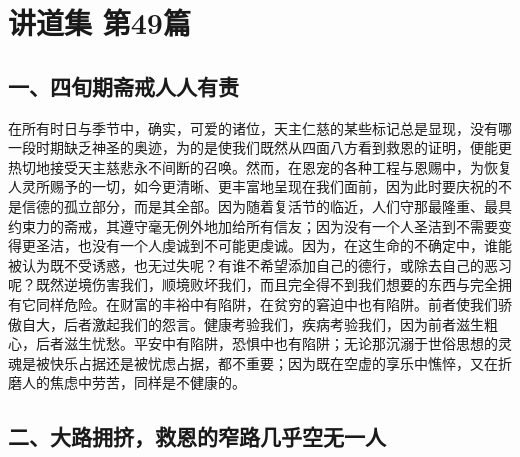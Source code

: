 
\section{讲道集 第49篇}

\par


\subsection{一、四旬期斋戒人人有责}

在所有时日与季节中，确实，可爱的诸位，天主仁慈的某些标记总是显现，没有哪一段时期缺乏神圣的奥迹，为的是使我们既然从四面八方看到救恩的证明，便能更热切地接受天主慈悲永不间断的召唤。然而，在恩宠的各种工程与恩赐中，为恢复人灵所赐予的一切，如今更清晰、更丰富地呈现在我们面前，因为此时要庆祝的不是信德的孤立部分，而是其全部。因为随着复活节的临近，人们守那最隆重、最具约束力的斋戒，其遵守毫无例外地加给所有信友；因为没有一个人圣洁到不需要变得更圣洁，也没有一个人虔诚到不可能更虔诚。因为，在这生命的不确定中，谁能被认为既不受诱惑，也无过失呢？有谁不希望添加自己的德行，或除去自己的恶习呢？既然逆境伤害我们，顺境败坏我们，而且完全得不到我们想要的东西与完全拥有它同样危险。在财富的丰裕中有陷阱，在贫穷的窘迫中也有陷阱。前者使我们骄傲自大，后者激起我们的怨言。健康考验我们，疾病考验我们，因为前者滋生粗心，后者滋生忧愁。平安中有陷阱，恐惧中也有陷阱；无论那沉溺于世俗思想的灵魂是被快乐占据还是被忧虑占据，都不重要；因为既在空虚的享乐中憔悴，又在折磨人的焦虑中劳苦，同样是不健康的。\par


\subsection{二、大路拥挤，救恩的窄路几乎空无一人}

